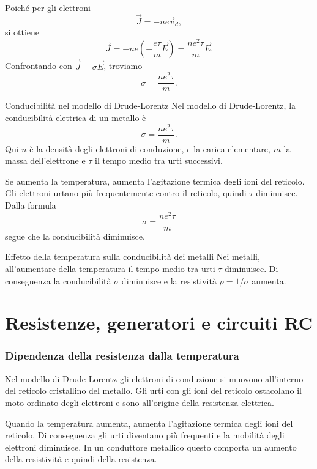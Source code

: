 \documentclass[a4paper]{article}
\begin{document}
Poiché per gli elettroni
\[
    \vec{J}=-ne\vec{v}_d,
\]
si ottiene
\[
    \vec{J}=-ne\left(-\frac{e\tau}{m}\vec{E}\right)
    =\frac{ne^2\tau}{m}\vec{E}.
\]
Confrontando con \(\vec{J}=\sigma\vec{E}\), troviamo
\[
    \sigma=\frac{ne^2\tau}{m}.
\]

\begin{snippetproposition}{Conducibilità nel modello di Drude-Lorentz}
    Nel modello di Drude-Lorentz, la conducibilità elettrica di un metallo è
    \[
        \sigma=\frac{ne^2\tau}{m}.
    \]
    Qui \(n\) è la densità degli elettroni di conduzione, \(e\) la carica elementare, \(m\) la massa dell'elettrone e \(\tau\) il tempo medio tra urti successivi.
\end{snippetproposition}

Se aumenta la temperatura, aumenta l'agitazione termica degli ioni del reticolo. Gli elettroni urtano più frequentemente contro il reticolo, quindi \(\tau\) diminuisce. Dalla formula
\[
    \sigma=\frac{ne^2\tau}{m}
\]
segue che la conducibilità diminuisce.

\begin{snippetproposition}{Effetto della temperatura sulla conducibilità dei metalli}
    Nei metalli, all'aumentare della temperatura il tempo medio tra urti \(\tau\) diminuisce. Di conseguenza la conducibilità \(\sigma\) diminuisce e la resistività \(\rho=1/\sigma\) aumenta.
\end{snippetproposition}

\pagebreak
\part{Resistenze, generatori e circuiti RC}

\section{Dipendenza della resistenza dalla temperatura}

Nel modello di Drude-Lorentz gli elettroni di conduzione si muovono all'interno del reticolo cristallino del metallo. Gli urti con gli ioni del reticolo ostacolano il moto ordinato degli elettroni e sono all'origine della resistenza elettrica.

Quando la temperatura aumenta, aumenta l'agitazione termica degli ioni del reticolo. Di conseguenza gli urti diventano più frequenti e la mobilità degli elettroni diminuisce. In un conduttore metallico questo comporta un aumento della resistività e quindi della resistenza.
\end{document}
